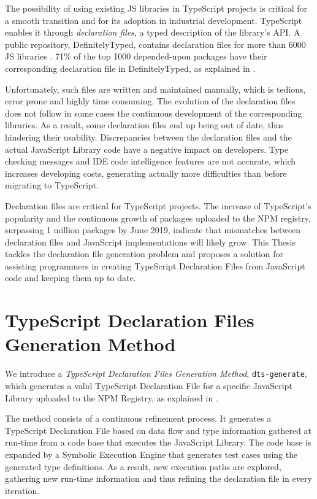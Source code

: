 The possibility of using existing JS libraries in TypeScript projects is critical for a smooth transition and for its adoption in industrial development. TypeScript enables it through \textit{declaration files}, a typed description of the library's API. A public repository, DefinitelyTyped, contains declaration files for more than 6000 JS libraries \citep{definitely-typed-repository}. 71\% of the top 1000 depended-upon packages have their corresponding declaration file in DefinitelyTyped, as explained in .

Unfortunately, such files are written and maintained manually, which is tedious, error prone and highly time consuming. The evolution of the declaration files does not follow in some cases the continuous development of the corresponding libraries. As a result, some declaration files end up being out of date, thus hindering their usability. Discrepancies between the declaration files and the actual JavaScript Library code have a negative impact on developers. Type checking messages and IDE code intelligence features are not accurate, which increases developing costs, generating actually more difficulties than before migrating to TypeScript.

Declaration files are critical for TypeScript projects. The increase of TypeScript's popularity and the continuous growth of packages uploaded to the NPM registry, surpassing 1 million packages by June 2019, indicate that mismatches between declaration files and JavaScript implementations will likely grow. This Thesis tackles the declaration file generation problem and proposes a solution for assisting programmers in creating TypeScript Declaration Files from JavaScript code and keeping them up to date.

\section{TypeScript Declaration Files Generation Method}

We introduce a \textit{TypeScript Declaration Files Generation Method}, \texttt{dts-generate}, which generates a valid TypeScript Declaration File for a specific JavaScript Library uploaded to the NPM Registry, as explained in .



The method consists of a continuous refinement process. It generates a TypeScript Declaration File based on data flow and type information gathered at run-time from a code base that executes the JavaScript Library. The code base is expanded by a Symbolic Execution Engine that generates test cases using the generated type definitions. As a result, new execution paths are explored, gathering new run-time information and thus refining the declaration file in every iteration.

